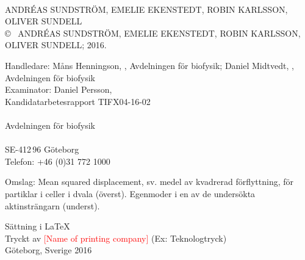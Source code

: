 
\clearpage
{}
\setcounter{page}{2}%
\thispagestyle{plain}

\begin{flushleft}


\vspace*{2cm}
\titel\\
\undertitel

ANDRÉAS SUNDSTRÖM, EMELIE EKENSTEDT, ROBIN KARLSSON, OLIVER SUNDELL \\[1cm]

\copyright ~ ANDRÉAS SUNDSTRÖM, EMELIE EKENSTEDT, ROBIN KARLSSON, OLIVER SUNDELL; 2016. 
\setlength{\parskip}{1cm}


Handledare: Måns Henningson, \institution, Avdelningen för biofysik;  Daniel Midtvedt, \institution, Avdelningen för biofysik\\
Examinator: Daniel Persson, \institution
\\[1cm]

Kandidatarbetesrapport TIFX04-16-02\\	%
\institution\\
Avdelningen för biofysik\\
\skola\\
SE-412\,96 Göteborg\\
Telefon: +46 (0)31 772 1000 
\setlength{\parskip}{0.5cm}

\vfill
Omslag: Mean squared displacement, sv. medel av kvadrerad förflyttning, för partiklar i celler i dvala (överst). Egenmoder i en av de undersökta aktinsträngarn (underst).
\setlength{\parskip}{1cm}

Sättning i \LaTeX \\
Tryckt av \textcolor{red}{[Name of printing company]} (Ex: Teknologtryck)\\
Göteborg, Sverige 2016


\setcounter{footnote}{0} 

\end{flushleft}

\renewcommand{\thefootnote}{\arabic{footnote}}
\setcounter{footnote}{0} 


